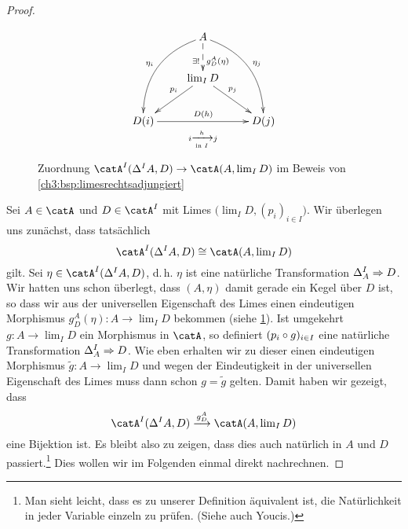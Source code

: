 \begin{proof}
    \let\origlim=\lim
    \renewcommand{\lim}{\origlim\nolimits}
    \begin{figure}
        \centering
        \begin{equation*}
                \xymatrix{
                    & \ar@/_1.5pc/[ddl]_{\eta_i} 
                    A \ar@/^1.5pc/[ddr]^{\eta_j} 
                    \ar@{-->}[d]_(.57){\exists!}^(.57){g_D^A(\eta)} &
                    \\
                    & \ar[dl]_(.4){p_i} \lim_I D 
                      \ar[dr]^(.4){p_j} &
                    \\
                    D(i) \ar[rr]^{D(h)}
                    \ar@{}@<-16pt>[rr]|-{i \xrightarrow[\text{in $I$}]{h} j}
                    & & D(j)
                }
        \end{equation*}
        \caption{Zuordnung $\catA^I(\Delta^I A, D) \to \catA(A,\lim_I D)$ im
            Beweis von \cref{ch3:bsp:limesrechtsadjungiert}}
        \label{ch3:fig:nattrafozumorphismus}
    \end{figure}
    Sei $A\in\catA$ und $D\in\catA^I$ mit Limes $\bigl(\lim_I D,(p_i)_{i\in I}\bigr)$.
    Wir überlegen uns zunächst, dass tatsächlich
    \[ \catA^I(\Delta^I A, D) \cong \catA(A,\lim_I D) \]
    gilt. Sei $\eta\in\catA^I(\Delta^I A, D)$, d.\,h. $\eta$ ist eine natürliche
    Transformation $\Delta^I_A\mathrel{\Rightarrow} D$. Wir hatten uns schon überlegt,
    dass $(A,\eta)$ damit gerade ein Kegel über $D$ ist, so dass wir aus der
    universellen Eigenschaft des Limes einen eindeutigen Morphismus
    $g_D^A(\eta)\colon A\to \lim_I D$ bekommen (siehe
    \cref{ch3:fig:nattrafozumorphismus}). Ist umgekehrt $g\colon A\to \lim_I D$
    ein Morphismus in $\catA$, so definiert $(p_i\after g)_{i\in I}$ eine
    natürliche Transformation $\Delta^I_A \mathrel{\Rightarrow} D$. Wie eben erhalten wir
    zu dieser einen eindeutigen Morphismus  $\tilde g\colon A\to\lim_I D$ und
    wegen der Eindeutigkeit in der universellen Eigenschaft des Limes muss dann
    schon $g=\tilde g$ gelten. Damit haben wir gezeigt, dass
    \[ \catA^I(\Delta^I A, D) \overset{g_D^A}\longto \catA(A,\lim_I D) \]
    eine Bijektion ist. Es bleibt also zu zeigen, dass dies auch natürlich in
    $A$ und $D$ passiert.\footnote{Man sieht leicht, dass es zu unserer
        Definition äquivalent ist, die Natürlichkeit in jeder Variable einzeln
        zu prüfen. (Siehe auch Youcis\cite{www:an:youcis:productcat2}.)%
    }
    Dies wollen wir im Folgenden einmal direkt nachrechnen.
    

\end{proof}

